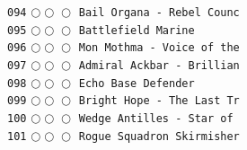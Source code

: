 \documentclass[a4paper,landscape]{article}
\begin{document}
\begin{multicols*}{5}
\texttt{094} \(\bigcirc\!\bigcirc\!\bigcirc\)  \texttt{Bail Organa - Rebel Counc} \vspace{-0.3mm}\\ 
\texttt{095} \(\bigcirc\!\bigcirc\!\bigcirc\)  \texttt{Battlefield Marine} \vspace{-0.3mm}\\ 
\texttt{096} \(\bigcirc\!\bigcirc\!\bigcirc\)  \texttt{Mon Mothma - Voice of the} \vspace{-0.3mm}\\ 
\texttt{097} \(\bigcirc\!\bigcirc\!\bigcirc\)  \texttt{Admiral Ackbar - Brillian} \vspace{-0.3mm}\\ 
\texttt{098} \(\bigcirc\!\bigcirc\!\bigcirc\)  \texttt{Echo Base Defender} \vspace{-0.3mm}\\ 
\texttt{099} \(\bigcirc\!\bigcirc\!\bigcirc\)  \texttt{Bright Hope - The Last Tr} \vspace{-0.3mm}\\ 
\texttt{100} \(\bigcirc\!\bigcirc\!\bigcirc\)  \texttt{Wedge Antilles - Star of } \vspace{-0.3mm}\\ 
\texttt{101} \(\bigcirc\!\bigcirc\!\bigcirc\)  \texttt{Rogue Squadron Skirmisher} \vspace{-0.3mm}\\ 

\end{multicols*}
\end{document}
